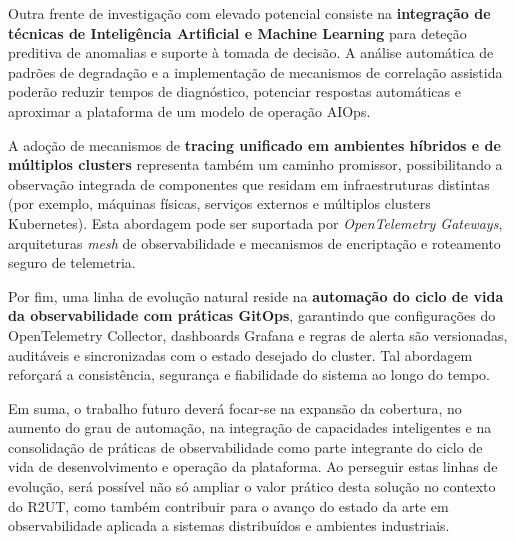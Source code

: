 Outra frente de investigação com elevado potencial consiste na \textbf{integração de técnicas de Inteligência Artificial e Machine Learning} para deteção preditiva de anomalias e suporte à tomada de decisão. A análise automática de padrões de degradação e a implementação de mecanismos de correlação assistida poderão reduzir tempos de diagnóstico, potenciar respostas automáticas e aproximar a plataforma de um modelo de operação AIOps.

A adoção de mecanismos de \textbf{tracing unificado em ambientes híbridos e de múltiplos clusters} representa também um caminho promissor, possibilitando a observação integrada de componentes que residam em infraestruturas distintas (por exemplo, máquinas físicas, serviços externos e múltiplos clusters Kubernetes). Esta abordagem pode ser suportada por \textit{OpenTelemetry Gateways}, arquiteturas \textit{mesh} de observabilidade e mecanismos de encriptação e roteamento seguro de telemetria.

Por fim, uma linha de evolução natural reside na \textbf{automação do ciclo de vida da observabilidade com práticas GitOps}, garantindo que configurações do OpenTelemetry Collector, dashboards Grafana e regras de alerta são versionadas, auditáveis e sincronizadas com o estado desejado do cluster. Tal abordagem reforçará a consistência, segurança e fiabilidade do sistema ao longo do tempo.

Em suma, o trabalho futuro deverá focar-se na expansão da cobertura, no aumento do grau de automação, na integração de capacidades inteligentes e na consolidação de práticas de observabilidade como parte integrante do ciclo de vida de desenvolvimento e operação da plataforma. Ao perseguir estas linhas de evolução, será possível não só ampliar o valor prático desta solução no contexto do R2UT, como também contribuir para o avanço do estado da arte em observabilidade aplicada a sistemas distribuídos e ambientes industriais.
